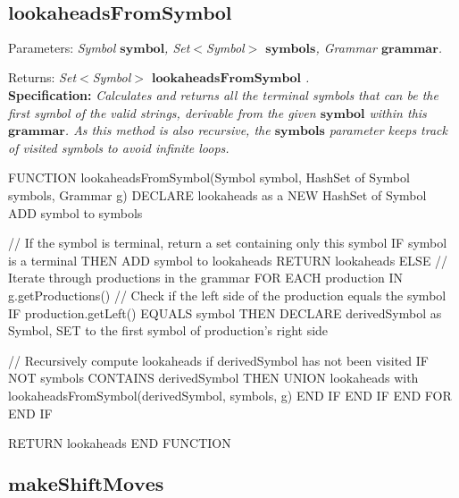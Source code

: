 \vspace{30pt}

\subsection{\(\boldsymbol{lookaheadsFromSymbol}\)}

Parameters: \textit{Symbol \(\boldsymbol{symbol}\), Set\(<\)Symbol\(>\) \(\boldsymbol{symbols}\), Grammar \(\boldsymbol{grammar}\).}

Returns: \textit{Set\(<\)Symbol\(>\) \(\boldsymbol{lookaheadsFromSymbol}\) .}\\

\textbf{Specification:} \textit{Calculates and returns all the terminal symbols that can be the first symbol of the valid strings, derivable from the given \(\boldsymbol{symbol}\) within this \(\boldsymbol{grammar}\). As this method is also recursive, the \(\boldsymbol{symbols}\) parameter keeps track of visited symbols to avoid infinite loops.}\\

\begin{codeblock}
    FUNCTION lookaheadsFromSymbol(Symbol symbol, HashSet of Symbol symbols, Grammar g)
    DECLARE lookaheads as a NEW HashSet of Symbol
    ADD symbol to symbols

    // If the symbol is terminal, return a set containing only this symbol
    IF symbol is a terminal THEN
    ADD symbol to lookaheads
    RETURN lookaheads
    ELSE
    // Iterate through productions in the grammar
    FOR EACH production IN g.getProductions()
    // Check if the left side of the production equals the symbol
    IF production.getLeft() EQUALS symbol THEN
    DECLARE derivedSymbol as Symbol, SET to the first symbol of production's right side

    // Recursively compute lookaheads if derivedSymbol has not been visited
    IF NOT symbols CONTAINS derivedSymbol THEN
    UNION lookaheads with lookaheadsFromSymbol(derivedSymbol, symbols, g)
    END IF
    END IF
    END FOR
    END IF

    RETURN lookaheads
    END FUNCTION

\end{codeblock}

\vspace{30pt}

\subsection{\(\boldsymbol{makeShiftMoves}\)}

